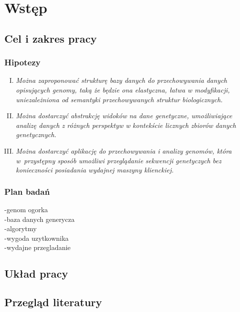 
\chapter{Wstęp}
\label{section:wstep}

\section{Cel i zakres pracy}
\label{section:cel_i_zakres_pracy}

\subsection{Hipotezy}

\begin{enumerate}[I.]
	\item \textit{
		Można zaproponować strukturę bazy danych do przechowywania danych opisujących genomy, taką że będzie ona elastyczna, łatwa w modyfikacji, uniezależniona od semantyki przechowywanych struktur biologicznych.
		} \\
	
	\item \textit{
		Można dostarczyć abstrakcję widoków na dane genetyczne, umożliwiające analizę danych z różnych perspektyw w kontekście licznych zbiorów
		danych genetycznych.
		} \\
	
	\item \textit{
		Można dostarczyć aplikację do przechowywania i analizy genomów, która w~przystępny sposób umożliwi przeglądanie sekwencji genetyczych bez konieczności posiadania wydajnej maszyny klienckiej. 
		} \\
	
\end{enumerate}

\subsection{Plan badań}
-genom ogorka \\
-baza danych generycza \\
-algorytmy \\
-wygoda uzytkownika \\
-wydajne przegladanie \\

\section{Układ pracy}
\label{section:uklad_pracy}

\section{Przegląd literatury}